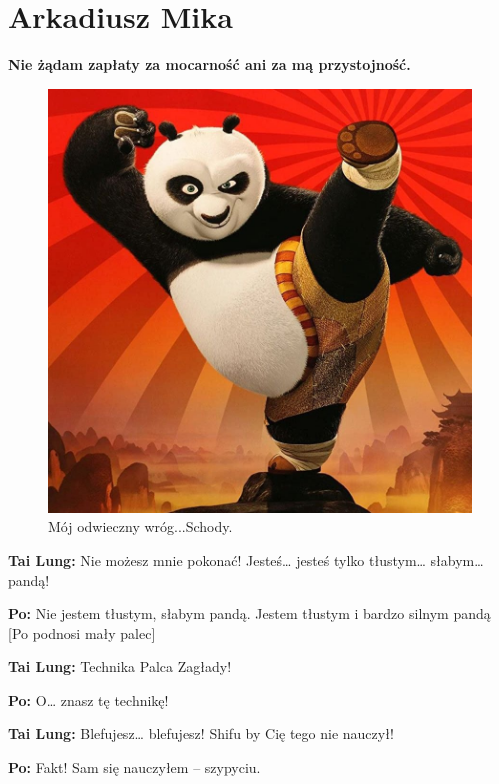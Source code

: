 \section{Arkadiusz Mika} 
\label{sec:amika}

\bigskip

\begin{center}
    {\Large \bf Nie żądam zapłaty za mocarność ani za mą przystojność.}
\end{center}

\begin{center}
    \begin{figure} [htbp]
        \centering
        \includegraphics[scale=0.25]{pictures/panda1.jpg} 
        \caption{\large Mój odwieczny wróg...Schody.}
        \label{fig:panda1}
    \end{figure}
\end{center}

\begin {flushleft}
    {\bf Tai Lung:} {\large Nie możesz mnie pokonać! Jesteś… jesteś tylko tłustym… słabym… pandą!} \par
    {\bf Po:} {\large Nie jestem tłustym, słabym pandą. Jestem tłustym i bardzo silnym pandą} [Po podnosi mały palec] \par
    {\bf Tai Lung:} {\large Technika Palca Zagłady!} \par
    {\bf Po:} {\large O… znasz tę technikę!} \par
    {\bf Tai Lung:} {\large Blefujesz… blefujesz! Shifu by Cię tego nie nauczył!} \par
    {\bf Po:} {\large Fakt! Sam się nauczyłem – szypyciu. }\par
\end {flushleft}

